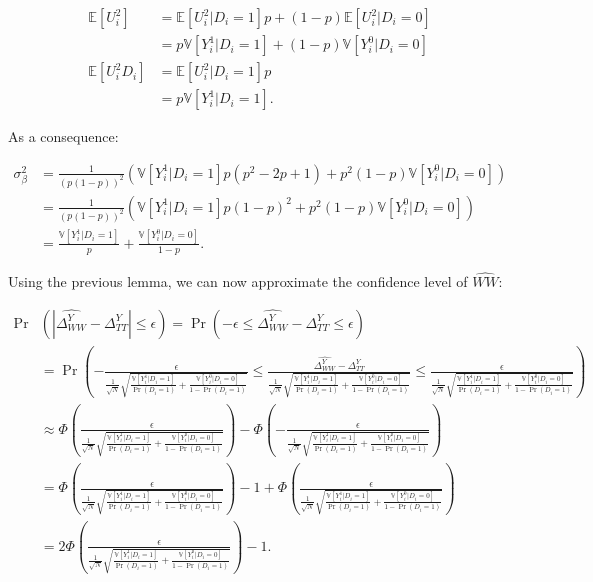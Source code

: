 \documentclass[]{book}
\newcommand{\esp}[1]{\mathbb{E}[ #1 ]}
\newcommand{\var}[1]{\mathbb{V}[ #1 ]}
\theoremstyle{definition}
\theoremstyle{definition}
\theoremstyle{definition}
\theoremstyle{remark}
\begin{document}
\begin{align*}
\esp{U_i^2} & = \esp{U_i^2|D_i=1}p + (1-p)\esp{U_i^2|D_i=0}\\
            & = p\var{Y_i^1|D_i=1}+(1-p)\var{Y_i^0|D_i=0} \\
\esp{U_i^2D_i}  & = \esp{U_i^2|D_i=1}p  \\
                & = p\var{Y_i^1|D_i=1}.
 \end{align*}

As a consequence:

\begin{align*}
\sigma^2_{\beta} &= \frac{1}{(p(1-p))^2}\left(\var{Y_i^1|D_i=1}p(p^2-2p+1) + p^2(1-p)\var{Y_i^0|D_i=0}\right) \\
                  &= \frac{1}{(p(1-p))^2}\left(\var{Y_i^1|D_i=1}p(1-p)^2 + p^2(1-p)\var{Y_i^0|D_i=0}\right)\\
                  & = \frac{\var{Y_i^1|D_i=1}}{p}+\frac{\var{Y_i^0|D_i=0}}{1-p}.
 \end{align*}

Using the previous lemma, we can now approximate the confidence level of
\(\hat{WW}\):

\begin{align*}
\Pr&(|\hat{\Delta^Y_{WW}}-\Delta^Y_{TT}|\leq\epsilon) = \Pr(-\epsilon\leq\hat{\Delta^Y_{WW}}-\Delta^Y_{TT}\leq\epsilon) \\
& = \Pr\left(-\frac{\epsilon}{\frac{1}{\sqrt{N}}\sqrt{\frac{\var{Y_i^1|D_i=1}}{\Pr(D_i=1)}+\frac{\var{Y_i^0|D_i=0}}{1-\Pr(D_i=1)}}}\leq\frac{\hat{\Delta^Y_{WW}}-\Delta^Y_{TT}}{\frac{1}{\sqrt{N}}\sqrt{\frac{\var{Y_i^1|D_i=1}}{\Pr(D_i=1)}+\frac{\var{Y_i^0|D_i=0}}{1-\Pr(D_i=1)}}}\leq\frac{\epsilon}{\frac{1}{\sqrt{N}}\sqrt{\frac{\var{Y_i^1|D_i=1}}{\Pr(D_i=1)}+\frac{\var{Y_i^0|D_i=0}}{1-\Pr(D_i=1)}}}\right)\\
& \approx \Phi\left(\frac{\epsilon}{\frac{1}{\sqrt{N}}\sqrt{\frac{\var{Y_i^1|D_i=1}}{\Pr(D_i=1)}+\frac{\var{Y_i^0|D_i=0}}{1-\Pr(D_i=1)}}}\right)-
\Phi\left(-\frac{\epsilon}{\frac{1}{\sqrt{N}}\sqrt{\frac{\var{Y_i^1|D_i=1}}{\Pr(D_i=1)}+\frac{\var{Y_i^0|D_i=0}}{1-\Pr(D_i=1)}}}\right)\\
& = \Phi\left(\frac{\epsilon}{\frac{1}{\sqrt{N}}\sqrt{\frac{\var{Y_i^1|D_i=1}}{\Pr(D_i=1)}+\frac{\var{Y_i^0|D_i=0}}{1-\Pr(D_i=1)}}}\right)- 1 + \Phi\left(\frac{\epsilon}{\frac{1}{\sqrt{N}}\sqrt{\frac{\var{Y_i^1|D_i=1}}{\Pr(D_i=1)}+\frac{\var{Y_i^0|D_i=0}}{1-\Pr(D_i=1)}}}\right)\\
& = 2\Phi\left(\frac{\epsilon}{\frac{1}{\sqrt{N}}\sqrt{\frac{\var{Y_i^1|D_i=1}}{\Pr(D_i=1)}+\frac{\var{Y_i^0|D_i=0}}{1-\Pr(D_i=1)}}}\right)-1.
\end{align*}
\end{document}
